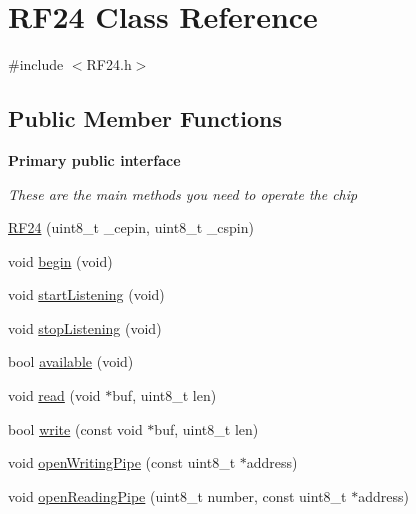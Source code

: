 \hypertarget{class_r_f24}{\section{R\+F24 Class Reference}
\label{class_r_f24}
}


{\ttfamily \#include $<$R\+F24.\+h$>$}

\subsection*{Public Member Functions}
\begin{Indent}{\bf Primary public interface}\par
{\em These are the main methods you need to operate the chip }\begin{DoxyCompactItemize}
\item 
\hyperlink{class_r_f24_a8cd165a822c8f77e10782c6729c5b088}{R\+F24} (uint8\+\_\+t \+\_\+cepin, uint8\+\_\+t \+\_\+cspin)
\item 
void \hyperlink{class_r_f24_a9e720d303ad594de611a813c69244517}{begin} (void)
\item 
void \hyperlink{class_r_f24_a30a2733a3889bdc331fe2d2f4f0f7b39}{start\+Listening} (void)
\item 
void \hyperlink{class_r_f24_a6f144d73fc447c8ac2d1a4166210fd88}{stop\+Listening} (void)
\item 
bool \hyperlink{class_r_f24_a127105eb7a3b351cfe777c1cec50627a}{available} (void)
\item 
void \hyperlink{class_r_f24_a8e2eacacfba96426c192066f04054c5b}{read} (void $\ast$buf, uint8\+\_\+t len)
\item 
bool \hyperlink{class_r_f24_a4cd4c198a47704db20b6b5cf0731cd58}{write} (const void $\ast$buf, uint8\+\_\+t len)
\item 
void \hyperlink{class_r_f24_af2e409e62d49a23e372a70b904ae30e1}{open\+Writing\+Pipe} (const uint8\+\_\+t $\ast$address)
\item 
void \hyperlink{class_r_f24_a9edc910ccc1ffcff56814b08faca5535}{open\+Reading\+Pipe} (uint8\+\_\+t number, const uint8\+\_\+t $\ast$address)
\end{DoxyCompactItemize}
\end{Indent}
